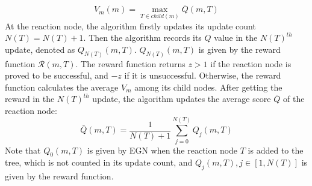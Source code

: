 \documentclass[sn-mathphys,Numbered]{sn-jnl}
\begin{document}
\begin{itemize}
        \begin{equation}
V_m(m)=\mathop{max}\limits_{T\in child(m)}\bar{Q}(m,T)
\end{equation}
    At the reaction node, the algorithm firstly updates its update count $N(T)=N(T)+1$. Then the algorithm records its $Q$ value in the $N(T)^{th}$ update, denoted as $Q_{N(T)}(m,T)$. $Q_{N(T)}(m,T)$ is given by the reward function $\mathcal{R}(m,T)$.
    The reward function returns $z>1$ if the reaction node is proved to be successful, and $-z$ if it is unsuccessful. Otherwise, the reward function calculates the average $V_m$ among its child nodes. After getting the reward in the $N(T)^{th}$ update, the algorithm updates the average score $\bar{Q}$ of the reaction node: 
        \begin{equation}\label{eq:score}
\bar{Q}(m,T)= \displaystyle\frac {1}{N(T)+1}\sum\limits_{j=0 }^{N(T)}Q_{j}(m,T)
\end{equation} 
    Note that $Q_0(m,T)$ is given by EGN when the reaction node $T$ is added to the tree, which is not counted in its update count, and $Q_j(m,T),j \in [1,N(T)]$ is given by the reward function. 
\end{itemize}


    
\end{document}
